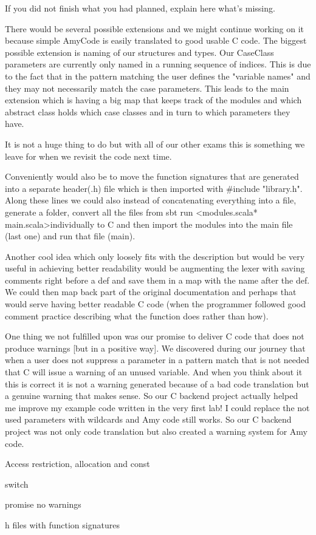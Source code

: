 If you did not finish what you had planned, explain here what's missing.


There would be several possible extensions and we might continue working on it because simple AmyCode is easily translated to good usable C code.
The biggest possible extension is naming of our structures and types. Our CaseClass parameters are currently only named in a running sequence of indices. This is due to the fact that in the pattern matching the user defines the "variable names" and they may not necessarily match the case parameters. This leads to the main extension which is having a big map that keeps track of the modules and which abstract class holds which case classes and in turn to which parameters they have.

It is not a huge thing to do but with all of our other exams this is something we leave for when we revisit the code next time.

Conveniently would also be to move the function signatures that are generated into a separate header(.h) file which is then imported with $\#$include "library.h".
Along these lines we could also instead of concatenating everything into a file, generate a folder, convert all the files from sbt run \textless modules.scala* main.scala\textgreater\space individually to C and then import the modules into the main file (last one) and run that file (main).

Another cool idea which only loosely fits with the description but would be very useful in achieving better readability would be augmenting the lexer with saving comments right before a def and save them in a map with the name after the def. We could then map back part of the original documentation and perhaps that would serve having better readable C code (when the programmer followed good comment practice describing what the function does rather than how).

One thing we not fulfilled upon was our promise to deliver C code that does not produce warnings [but in a positive way]. We discovered during our journey that when a user does not suppress a parameter in a pattern match that is not needed that C will issue a warning of an unused variable. And when you think about it this is correct it is not a warning generated because of a bad code translation but a genuine warning that makes sense. So our C backend project actually helped me improve my example code written in the very first lab! I could replace the not used parameters with wildcards and Amy code still works. So our C backend project was not only code translation but also created a warning system for Amy code.

Access restriction, allocation and const

switch  

promise no warnings

h files with function signatures